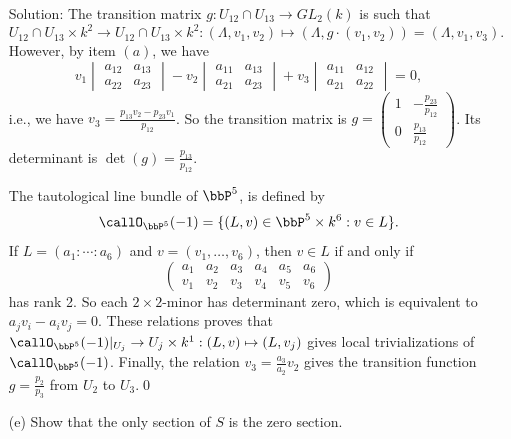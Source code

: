 \begin{enumerate}
 Solution: The transition matrix $g: U_{12}\cap U_{13}\to GL_2(k)$ is such that 
\begin{equation}
    U_{12}\cap U_{13} \times k^2 \to U_{12}\cap U_{13}\times k^2: (\Lambda, v_1,v_2)\mapsto (\Lambda, g\cdot (v_1,v_2))
    =(\Lambda, v_1,v_3).
\end{equation}
However, by item $(a)$, we have 
\begin{equation}
    v_1\begin{vmatrix}
a_{12} & a_{13}\\
a_{22} & a_{23}
\end{vmatrix}
- v_2
\begin{vmatrix}
a_{11} & a_{13}\\
a_{21} & a_{23}
\end{vmatrix}
+v_3
\begin{vmatrix}
a_{11} & a_{12}\\
a_{21} & a_{22}
\end{vmatrix} = 0,
\end{equation}
i.e., we have $v_3 = \tfrac{p_{13}v_2 - p_{23}v_1}{p_{12}}$. So the transition matrix is 
$g= \left(\begin{smallmatrix}1&-\tfrac{p_{23}}{p_{12}}\\0&\tfrac{p_{13}}{p_{12}}\end{smallmatrix}\right)$. Its determinant 
is $\det(g)= \tfrac{p_{13}}{p_{12}}$.\par 

The tautological line bundle of $\bbP^5$, is defined by 
\begin{equation}
    \callO_{\bbP^5}(-1) = \{(L,v)\in\bbP^5\times k^6: v\in L\}.
\end{equation}
If $L=(a_1:\cdots:a_6)$ and $v=(v_1,\dots, v_6)$, then $v\in L$ if and only if 
\begin{equation}
    \begin{pmatrix}
        a_1 &a_2&a_3&a_4&a_5&a_6\\ v_1&v_2&v_3&v_4&v_5&v_6
    \end{pmatrix}
\end{equation}
has rank 2. So each $2\times 2$-minor has determinant zero, which is equivalent to $a_jv_i - a_i v_j=0$. 
These relations proves that $\callO_{\bbP^5}(-1)|_{U_j}\to U_j\times k^1:(L,v)\mapsto (L,v_j)$ gives local 
trivializations of $\callO_{\bbP^5}(-1)$. Finally, the relation $v_3 = \tfrac{a_3}{a_2}v_2$ gives the transition function
$g=\tfrac{p_2}{p_3}$ from $U_2$ to $U_3$.\qed


\item[(e)] Show that the only section of $S$ is the zero section.\par 


\end{enumerate}
